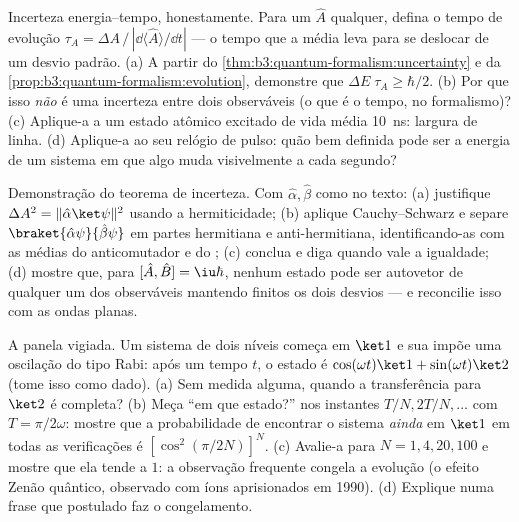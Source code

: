 \begin{exercise}[$\star\star\star$]\label{exo:b3:quantum-formalism:10}
Incerteza energia--tempo, honestamente. Para um  $\hat A$
qualquer, defina o tempo de evolução $\tau_A = \Delta A\,/\,|\dd\langle\hat
A\rangle/\dd t|$ --- o tempo que a média leva para se deslocar de um
desvio padrão. (a) A partir do
\cref{thm:b3:quantum-formalism:uncertainty} e da
\cref{prop:b3:quantum-formalism:evolution}, demonstre que $\Delta
E\;\tau_A \ge \hbar/2$. (b) Por que isso \emph{não} é uma incerteza
entre dois observáveis (o que é o tempo, no formalismo)? (c) Aplique-a
a um estado atômico excitado de vida média \qty{10}{ns}: largura de
linha. (d) Aplique-a ao seu relógio de pulso: quão bem definida pode
ser a energia de um sistema em que algo muda visivelmente a cada
segundo?
\end{exercise}

\begin{exercise}[$\star\star\star$]\label{exo:b3:quantum-formalism:11}
Demonstração do teorema de incerteza. Com $\hat\alpha, \hat\beta$ como
no texto: (a) justifique $\Delta A^2 = \|\hat\alpha\ket\psi\|^2$ usando
a hermiticidade; (b) aplique Cauchy--Schwarz e separe
$\braket{\hat\alpha\psi}{\hat\beta\psi}$ em partes hermitiana e
anti-hermitiana, identificando-as com as médias do anticomutador e do
; (c) conclua e diga quando vale a igualdade;
(d) mostre que, para $[\hat A, \hat B] = \iu\hbar$, nenhum estado pode
ser autovetor de qualquer um dos observáveis mantendo finitos os dois
desvios --- e reconcilie isso com as ondas planas.
\end{exercise}

\begin{exercise}[$\star\star\star$]\label{exo:b3:quantum-formalism:12}
A panela vigiada. Um sistema de dois níveis começa em $\ket1$ e sua
 impõe uma oscilação do tipo Rabi: após um tempo $t$, o
estado é $\cos(\omega t)\ket1 + \sin(\omega t)\ket2$ (tome isso como
dado). (a) Sem medida alguma, quando a transferência para $\ket2$ é
completa? (b) Meça ``em que estado?'' nos instantes $T/N, 2T/N, \dots$
com $T =
\pi/2\omega$: mostre que a probabilidade de encontrar o sistema
\emph{ainda} em $\ket1$ em todas as verificações é $[\cos^2(\pi/2N)]^N$.
(c) Avalie-a para $N = 1, 4, 20, 100$ e mostre que ela tende a $1$: a
observação frequente congela a evolução (o efeito Zenão quântico,
observado com íons aprisionados em 1990). (d) Explique numa frase que
postulado faz o congelamento.
\end{exercise}

